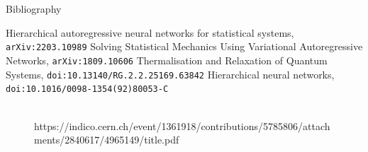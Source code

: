 \documentclass{beamer}
\begin{document}
\section*{~}

\begin{frame}{Bibliography}
    \begin{thebibliography}{7}
    Hierarchical autoregressive neural networks for statistical systems, \texttt{arXiv:2203.10989}
    Solving Statistical Mechanics Using Variational Autoregressive Networks, \texttt{arXiv:1809.10606}
     Thermalisation and Relaxation of Quantum Systems, \texttt{doi:10.13140/RG.2.2.25169.63842}
     Hierarchical neural networks, \texttt{doi:10.1016/0098-1354(92)80053-C}
    \end{thebibliography}
\end{frame}

\begin{frame}{}

\begin{figure}

\centering
    \end{figure}


    
    \begin{figure}
    \centering
    \\
    {\tiny https://indico.cern.ch/event/1361918/contributions/5785806/attachments/2840617/4965149/title.pdf}

    \end{figure}
\end{frame}

    
\end{document}
